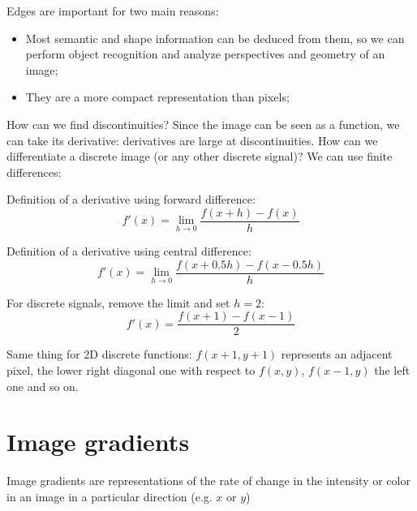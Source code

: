 \documentclass{article}
\begin{document}
Edges are important for two main reasons:

\begin{itemize}
    \item Most semantic and shape information can be deduced from them, so we can perform object recognition and analyze perspectives and geometry of an image;
    \item They are a more compact representation than pixels;
\end{itemize}

How can we find discontinuities? Since the image can be seen as a function, we can take its derivative: derivatives are large at discontinuities.
How can we differentiate a discrete image (or any other discrete signal)? We can use finite differences:

\vspace{0.5cm}

Definition of a derivative using forward difference:
\begin{equation*}
    f'(x) = \lim_{h\to 0} \frac{f(x + h) - f(x)}{h}
\end{equation*}

\vspace{0.5cm}

Definition of a derivative using central difference:
\begin{equation*}
    f'(x) = \lim_{h\to 0} \frac{f(x + 0.5h) - f(x - 0.5h)}{h}
\end{equation*}

\vspace{0.5cm}

For discrete signals, remove the limit and set $h = 2$:
\begin{equation*}
    f'(x) = \frac{f(x + 1) - f(x - 1)}{2}
\end{equation*}

\vspace{0.5cm}

Same thing for 2D discrete functions: $f(x + 1, y + 1)$ represents an adjacent pixel, the lower right diagonal one with respect to $f(x, y)$, $f(x - 1, y)$ the left one and so on.

\newpage

\section*{Image gradients}

Image gradients are representations of the rate of change in the intensity or color in an image in a particular direction (e.g. $x$ or $y$)
\end{document}
